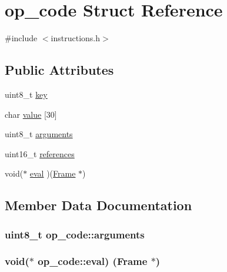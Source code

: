 \hypertarget{structop__code}{}\section{op\+\_\+code Struct Reference}
\label{structop__code}


{\ttfamily \#include $<$instructions.\+h$>$}

\subsection*{Public Attributes}
\begin{DoxyCompactItemize}
\item 
uint8\+\_\+t \hyperlink{structop__code_adfbb2fc6e07e6fda7e392c0b6f6f64b6}{key}
\item 
char \hyperlink{structop__code_a0b74d91235a8b9f0a36710d68c2746d1}{value} \mbox{[}30\mbox{]}
\item 
uint8\+\_\+t \hyperlink{structop__code_ac059fd01f71776bebdc8fcccd44f7476}{arguments}
\item 
uint16\+\_\+t \hyperlink{structop__code_a8d28fff7d91873f58a4a12205dd0f8e0}{references}
\item 
void($\ast$ \hyperlink{structop__code_acd2c8c9ef3e72b9f110127c854620472}{eval} )(\hyperlink{structFrame}{Frame} $\ast$)
\end{DoxyCompactItemize}


\subsection{Member Data Documentation}
\subsubsection[{\texorpdfstring{arguments}{arguments}}]{\setlength{\rightskip}{0pt plus 5cm}uint8\+\_\+t op\+\_\+code\+::arguments}\hypertarget{structop__code_ac059fd01f71776bebdc8fcccd44f7476}{}\label{structop__code_ac059fd01f71776bebdc8fcccd44f7476}
\subsubsection[{\texorpdfstring{eval}{eval}}]{\setlength{\rightskip}{0pt plus 5cm}void($\ast$  op\+\_\+code\+::eval) ({\bf Frame} $\ast$)}\hypertarget{structop__code_acd2c8c9ef3e72b9f110127c854620472}{}\label{structop__code_acd2c8c9ef3e72b9f110127c854620472}
